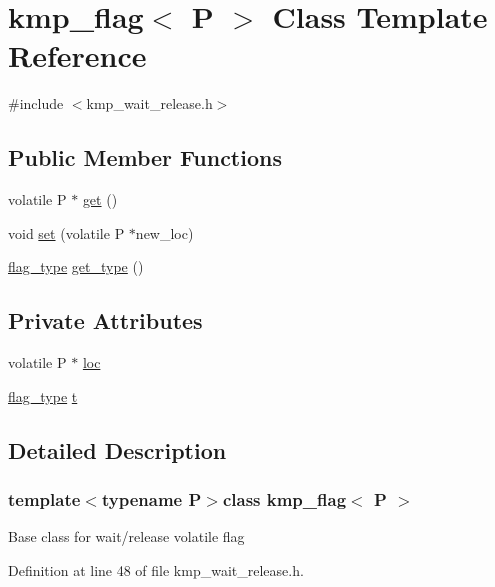 \hypertarget{classkmp__flag}{\section{kmp\-\_\-flag$<$ P $>$ Class Template Reference}
\label{classkmp__flag}
}


{\ttfamily \#include $<$kmp\-\_\-wait\-\_\-release.\-h$>$}

\subsection*{Public Member Functions}
\begin{DoxyCompactItemize}
\item 
volatile P $\ast$ \hyperlink{classkmp__flag_af653ec27d16d63dab994e52ac6713aed}{get} ()
\item 
void \hyperlink{classkmp__flag_a61a56555c28015b8f0df8b9c33fea599}{set} (volatile P $\ast$new\-\_\-loc)
\item 
\hyperlink{group__WAIT__RELEASE_ga507a7197646f995b5529a68c1481e39b}{flag\-\_\-type} \hyperlink{classkmp__flag_a36961b6d49f84ab81365a9389613ea34}{get\-\_\-type} ()
\end{DoxyCompactItemize}
\subsection*{Private Attributes}
\begin{DoxyCompactItemize}
\item 
volatile P $\ast$ \hyperlink{classkmp__flag_a5d89de3bda829ab9be324007d915aa3b}{loc}
\item 
\hyperlink{group__WAIT__RELEASE_ga507a7197646f995b5529a68c1481e39b}{flag\-\_\-type} \hyperlink{classkmp__flag_aebad8727c9520d1bb2b2219c94cb3c62}{t}
\end{DoxyCompactItemize}


\subsection{Detailed Description}
\subsubsection*{template$<$typename P$>$class kmp\-\_\-flag$<$ P $>$}

Base class for wait/release volatile flag 

Definition at line 48 of file kmp\-\_\-wait\-\_\-release.\-h.



